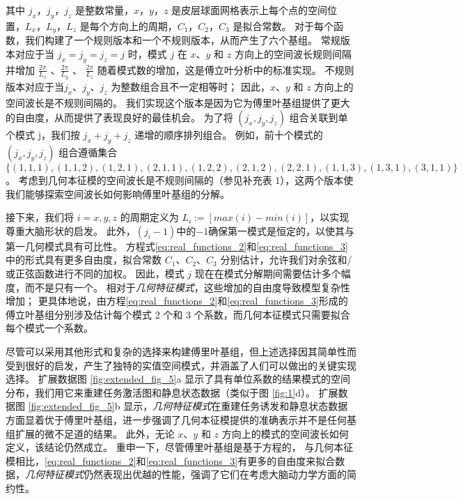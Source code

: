 \documentclass[lang=cn,a4paper,newtx]{elegantpaper}
\begin{document}
其中 $ j_x $，$ j_y $，$ j_z $ 是整数常量，$ x $，$ y $，$ z $ 是皮层球面网格表示上每个点的空间位置，$ L_x $，$ L_y $，$ L_z $ 是每个方向上的周期，$ C_1 $，$ C_2 $，$ C_3 $ 是拟合常数。
对于每个函数，我们构建了一个规则版本和一个不规则版本，从而产生了六个基组。
常规版本对应于当 $ j_x=j_y=j_z=j $ 时，模式 $ j $ 在 $ x $、$ y $ 和 $ z $ 方向上的空间波长规则间隔并增加 $ \frac{2 \pi}{L_x} $ 、$\frac{2 \pi}{L_y}$ 、 $\frac{2 \pi}{L_z}$ 随着模式数的增加，这是傅立叶分析中的标准实现。
不规则版本对应于当$ j_x $、$ j_y $、$ j_z $ 为整数组合且不一定相等时；
因此，$ x $、$ y $ 和 $ z $ 方向上的空间波长是不规则间隔的。
我们实现这个版本是因为它为傅里叶基组提供了更大的自由度，从而提供了表现良好的最佳机会。
为了将 $ (j_x,j_y,j_z) $ 组合关联到单个模式 j，我们按 $ j_x+j_y+j_z $ 递增的顺序排列组合。
例如，前十个模式的 $ (j_x,j_y,j_z) $ 组合遵循集合 $ \{(1,1,1),(1,1,2),(1,2,1),(2,1, 1),(1,2,2),(2,1,2),(2,2,1),(1,1,3),(1,3,1),(3,1,1) \} $。
考虑到几何本征模的空间波长是不规则间隔的（参见补充表 1），这两个版本使我们能够探索空间波长如何影响傅里叶基组的分解。


接下来，我们将 $ i=x, y, z $ 的周期定义为 $ L_i := [ max(i) - min(i) ] $，以实现尊重大脑形状的启发。 
此外，$ (j_i-1) $中的$ -1 $确保第一模式是恒定的，以使其与第一几何模式具有可比性。
方程式\ref{eq:real_functions_2}和\ref{eq:real_functions_3}中的形式具有更多自由度，拟合常数 $ C_1 $、$ C_2 $、$ C_3 $ 分别估计，允许我们对余弦和/或正弦函数进行不同的加权。
因此，模式 $ j $ 现在在模式分解期间需要估计多个幅度，而不是只有一个。
相对于\textit{几何特征模式}，这些增加的自由度导致模型复杂性增加；
更具体地说，由方程\ref{eq:real_functions_2}和\ref{eq:real_functions_3}形成的傅立叶基组分别涉及估计每个模式 2 个和 3 个系数，而几何本征模式只需要拟合每个模式一个系数。


尽管可以采用其他形式和复杂的选择来构建傅里叶基组，但上述选择因其简单性而受到很好的启发，产生了独特的实值空间模式，并涵盖了人们可以做出的关键实现选择。
扩展数据图 \ref{fig:extended_fig_5}a 显示了具有单位系数的结果模式的空间分布，我们用它来重建任务激活图和静息状态数据（类似于图 \ref{fig:1}d）。
扩展数据图 \ref{fig:extended_fig_5}b 显示，\textit{几何特征模式}在重建任务诱发和静息状态数据方面显着优于傅里叶基组，进一步强调了几何本征模提供的准确表示并不是任何基组扩展的微不足道的结果。
此外，无论 $ x $、$ y $ 和 $ z $ 方向上的模式的空间波长如何定义，该结论仍然成立。
重申一下，尽管傅里叶基组是基于方程的，
与几何本征模相比，\ref{eq:real_functions_2}和\ref{eq:real_functions_3}有更多的自由度来拟合数据，\textit{几何特征模式}仍然表现出优越的性能，强调了它们在考虑大脑动力学方面的简约性。
\end{document}
